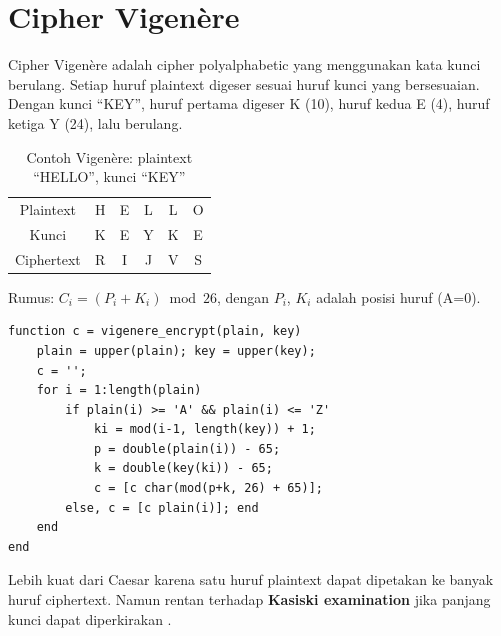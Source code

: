 \section{Cipher Vigenère}

Cipher Vigenère adalah cipher polyalphabetic yang menggunakan kata kunci berulang. Setiap huruf plaintext digeser sesuai huruf kunci yang bersesuaian. Dengan kunci ``KEY'', huruf pertama digeser K (10), huruf kedua E (4), huruf ketiga Y (24), lalu berulang.

\begin{table}[!htbp]
\centering
\caption{Contoh Vigenère: plaintext ``HELLO'', kunci ``KEY''}
\label{tab:vigenere}
\begin{tabular}{@{}cccccc@{}}
\toprule
Plaintext & H & E & L & L & O \\
Kunci & K & E & Y & K & E \\
Ciphertext & R & I & J & V & S \\
\bottomrule
\end{tabular}
\end{table}
Rumus: $C_i = (P_i + K_i) \bmod 26$, dengan $P_i$, $K_i$ adalah posisi huruf (A=0).

\begin{lstlisting}[style=matlab,caption={Vigenère Cipher dalam MATLAB}]
function c = vigenere_encrypt(plain, key)
    plain = upper(plain); key = upper(key);
    c = '';
    for i = 1:length(plain)
        if plain(i) >= 'A' && plain(i) <= 'Z'
            ki = mod(i-1, length(key)) + 1;
            p = double(plain(i)) - 65;
            k = double(key(ki)) - 65;
            c = [c char(mod(p+k, 26) + 65)];
        else, c = [c plain(i)]; end
    end
end
\end{lstlisting}

Lebih kuat dari Caesar karena satu huruf plaintext dapat dipetakan ke banyak huruf ciphertext. Namun rentan terhadap \textbf{Kasiski examination} jika panjang kunci dapat diperkirakan \cite{schneier1996,trappe2006}.
